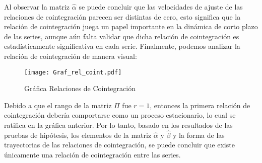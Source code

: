 Al observar la matriz $\hat{\alpha}$ se puede concluir que las velocidades de ajuste de las relaciones de cointegración parecen ser distintas de cero, esto significa que la relación de cointegración juega un papel importante en la dinámica de corto plazo de las series, aunque aún falta validar que dicha relación de cointegración es estadísticamente significativa en cada serie. Finalmente, podemos analizar la relación de cointegración de manera visual:

\begin{figure}[H]
\centering
\texttt{[image: Graf\_rel\_coint.pdf]}
\caption{Gráfica Relaciones de Cointegración}
\label{graf_rel_coint}
\end{figure}

Debido a que el rango de la matriz $\Pi$ fue $r=1$, entonces la primera relación de cointegración debería comportarse como un proceso estacionario, lo cual se ratifica en la gráfica anterior. Por lo tanto, basado en los resultados de las pruebas de hipótesis, los elementos de la matriz  $\hat{\alpha}$ y $\hat{\beta}$ y la forma de las trayectorias de las relaciones de cointegración, se puede concluir que existe únicamente una relación de cointegración entre las series.








